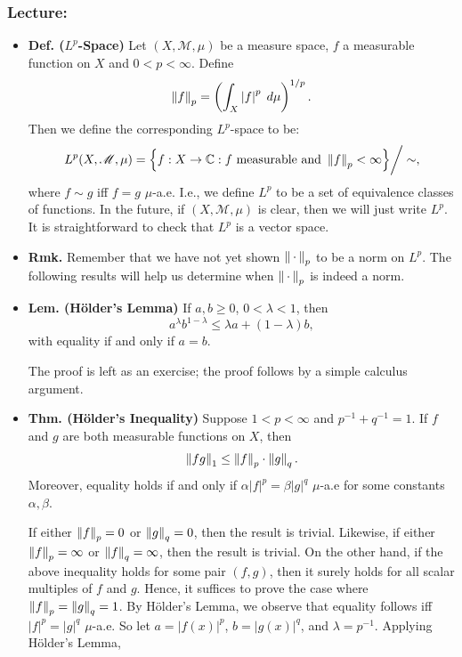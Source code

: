 \documentclass{article}
\begin{document}
\subsubsection{Lecture:} 
\begin{itemize}
	\item \textbf{Def. ($L^{p}$-Space)} Let $(X, \mathscr{M}, \mu)$ be a measure space, $f$ a measurable function on $X$ and $0 < p < \infty$. Define 
		\begin{equation}
			\left\Vert f \right\Vert_{p} = \left(\int_{X}\left| f \right|^{p}\;d\mu\right)^{1/p}. 
		\end{equation}
	Then we define the corresponding $L^{p}$-space to be: 
		\begin{equation}
			L^{p}(X, \mathscr{M}, \mu) = \brac*{f: X \to \mathbb{C}: f \text{ measurable and } \norm{f}_{p} < \infty}\bigg/ \sim, 
		\end{equation}
	where $f \sim g$ iff $f = g$ $\mu$-a.e. I.e., we define $L^{p}$ to be a set of equivalence classes of functions. In the future, if $(X, \mathscr{M}, \mu)$ is clear, then we will just write $L^{p}$. It is straightforward to check that $L^{p}$ is a vector space. 
	\item \textbf{Rmk.} Remember that we have not yet shown $\left\Vert \hspace{2pt}\cdot\hspace{2pt} \right\Vert_{p}$ to be a norm on $L^{p}$. The following results will help us determine when $\left\Vert \hspace{2pt}\cdot\hspace{2pt} \right\Vert_{p}$ is indeed a norm. 
	\item \textbf{Lem. (H\"older's Lemma)} If $a, b \geq 0$, $0 < \lambda < 1$, then 
		\begin{equation}
			a^{\lambda}b^{1 - \lambda} \leq \lambda a + (1 - \lambda)b,
		\end{equation}
	with equality if and only if $a = b$. 	\newline 
	\begin{solutions}
		The proof is left as an exercise; the proof follows by a simple calculus argument. 
	\end{solutions}
	\item \textbf{Thm. (H\"older's Inequality)} Suppose $1 < p < \infty$ and $p^{-1} + q^{-1} = 1$. If $f$ and $g$ are both measurable functions on $X$, then 
		\begin{equation}
			\left\Vert fg \right\Vert_{1} \leq \left\Vert f \right\Vert_{p} \cdot \left\Vert g \right\Vert_{q}. 
		\end{equation}
	Moreover, equality holds if and only if $\alpha |f|^{p} = \beta |g|^{q}$ $\mu$-a.e for some constants $\alpha, \beta$. \newline 
	\begin{solutions}
		If either $\left\Vert f \right\Vert_{p} = 0$ or $\left\Vert g \right\Vert_{q} = 0$, then the result is trivial. Likewise, if either $\left\Vert f \right\Vert_{p} = \infty$ or $\left\Vert f \right\Vert_{q} = \infty$, then the result is trivial. On the other hand, if the above inequality holds for some pair $(f,g)$, then it surely holds for all scalar multiples of $f$ and $g$. Hence, it suffices to prove the case where $\left\Vert f \right\Vert_{p} = \left\Vert g \right\Vert_{q} = 1$. By H\"older's Lemma, we observe that equality follows iff $|f|^{p} = |g|^{q}$ $\mu$-a.e. So let $a = |f(x)|^{p}$, $b = |g(x)|^{q}$, and $\lambda = p^{-1}$. Applying H\"older's Lemma, 

\end{solutions}
\end{itemize}
\end{document}
